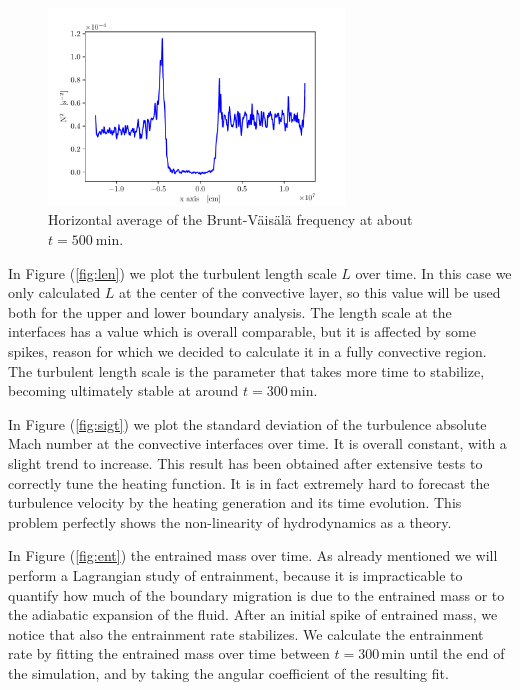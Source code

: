 \begin{figure}[t!]
\centering
\includegraphics[width=0.7\textwidth]{./img/brunt}
\caption{Horizontal average of the Brunt-Väisälä frequency at about $t=500 \ \mathrm{min}$.}
\label{fig:brunt}
\end{figure}
In Figure (\ref{fig:len}) we plot the turbulent length scale $L$ over time. In this case we only calculated $L$ at the center of the convective layer, so this value will be used both for the upper and lower boundary analysis. The length scale at the interfaces has a value which is overall comparable, but it is affected by some spikes, reason for which we decided to calculate it in a fully convective region. The turbulent length scale is the parameter that takes more time to stabilize, becoming ultimately stable at around $t = 300 \, \mathrm{min}$. 
 
In Figure (\ref{fig:sigt}) we plot the standard deviation of the turbulence absolute Mach number at the convective interfaces over time. It is overall constant, with a slight trend to increase. This result has been obtained after extensive tests to correctly tune the heating function. It is in fact extremely hard to forecast the turbulence velocity by the heating generation and its time evolution. This problem perfectly shows the non-linearity of hydrodynamics as a theory.

In Figure (\ref{fig:ent}) the entrained mass over time. As already mentioned we will perform a Lagrangian study of entrainment, because it is impracticable to quantify how much of the boundary migration is due to the entrained mass or to the adiabatic expansion of the fluid. After an initial spike of entrained mass, we notice that also the entrainment rate stabilizes. We calculate the entrainment rate by fitting the entrained mass over time between $t = 300 \, \mathrm{min}$ until the end of the simulation, and by taking the angular coefficient of the resulting fit. 

